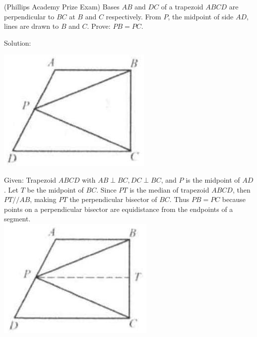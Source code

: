 \documentclass{article}
\begin{document}
(Phillips Academy Prize Exam) Bases \(A B\) and \(D C\) of a trapezoid \(A B C D\) are perpendicular to \(B C\) at \(B\) and \(C\) respectively. From \(P\), the midpoint of side \(A D\), lines are drawn to \(B\) and \(C\). Prove: \(P B=P C\).

Solution:
\begin{center}
\includegraphics[width=\textwidth]{images/037(2).jpg}
\end{center}

Given: Trapezoid \(A B C D\) with \(A B \perp B C, D C \perp B C\), and \(P\) is the midpoint of \(A D\). Let \(T\) be the midpoint of \(B C\). Since \(P T\) is the median of trapezoid \(A B C D\), then \(P T / / A B\), making \(P T\) the perpendicular bisector of \(B C\). Thus \(P B=P C\) because points on a perpendicular bisector are equidistance from the endpoints of a segment.\\
\centering
\includegraphics[width=\textwidth]{images/037(1).jpg}
\end{document}
